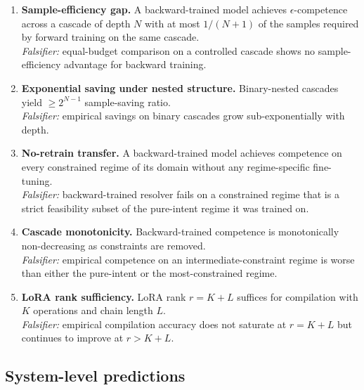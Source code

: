 \documentclass[twocolumn,11pt,a4paper]{article}
\begin{document}
\begin{enumerate}[leftmargin=*,itemsep=3pt]
\item \textbf{Sample-efficiency gap.} A backward-trained model achieves $\epsilon$-competence across a cascade of depth $N$ with at most $1/(N+1)$ of the samples required by forward training on the same cascade.\\
\emph{Falsifier:} equal-budget comparison on a controlled cascade shows no sample-efficiency advantage for backward training.

\item \textbf{Exponential saving under nested structure.} Binary-nested cascades yield $\geq 2^{N-1}$ sample-saving ratio.\\
\emph{Falsifier:} empirical savings on binary cascades grow sub-exponentially with depth.

\item \textbf{No-retrain transfer.} A backward-trained model achieves competence on every constrained regime of its domain without any regime-specific fine-tuning.\\
\emph{Falsifier:} backward-trained resolver fails on a constrained regime that is a strict feasibility subset of the pure-intent regime it was trained on.

\item \textbf{Cascade monotonicity.} Backward-trained competence is monotonically non-decreasing as constraints are removed.\\
\emph{Falsifier:} empirical competence on an intermediate-constraint regime is worse than either the pure-intent or the most-constrained regime.

\item \textbf{LoRA rank sufficiency.} LoRA rank $r = K + L$ suffices for compilation with $K$ operations and chain length $L$.\\
\emph{Falsifier:} empirical compilation accuracy does not saturate at $r = K + L$ but continues to improve at $r > K + L$.
\end{enumerate}

\subsection{System-level predictions}
\end{document}
